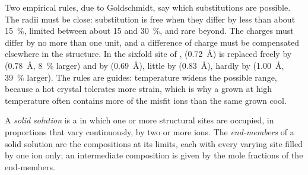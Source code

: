 Two empirical rules, due to Goldschmidt, say which substitutions are possible.
The radii must be close: substitution is free when they differ by less than
about \qty{15}{\percent}, limited between about 15 and \qty{30}{\percent}, and
rare beyond. The charges must differ by no more than one unit, and a
difference of charge must be compensated elsewhere in the structure. In the
sixfold site of ,  (\qty{0.72}{\angstrom}) is replaced
freely by  (\qty{0.78}{\angstrom}, \qty{8}{\percent} larger) and
by  (\qty{0.69}{\angstrom}), little by 
(\qty{0.83}{\angstrom}), hardly by  (\qty{1.00}{\angstrom},
\qty{39}{\percent} larger).
The rules are guides: temperature widens the possible range, because a hot
crystal tolerates more strain, which is why a  grown at high
temperature often contains more of the misfit ions than the same 
grown cool.

\begin{definition}\label{def:b1:rock-forming-minerals:solid-solution}
A \emph{solid solution} is a  in which
one or more structural sites are occupied, in proportions that vary
continuously, by two or more ions. The \emph{end-members} of
a solid solution are the compositions at its limits, each with every varying
site filled by one ion only; an intermediate composition is given by the mole
fractions of the end-members.
\end{definition}

